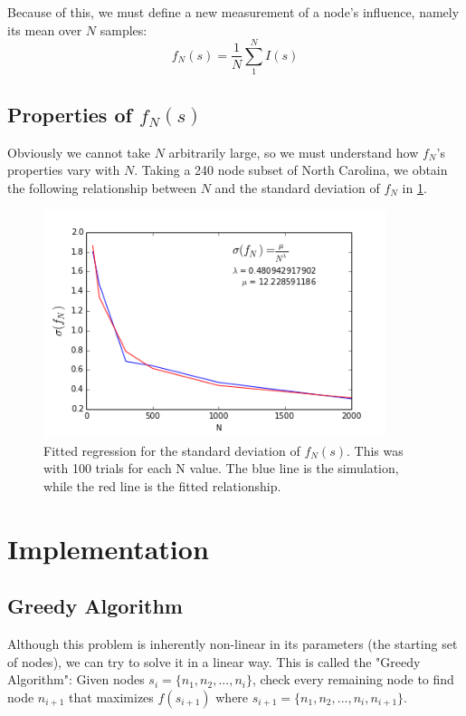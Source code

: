 \documentclass{article}
\begin{document}
	Because of this, we must define a new measurement of a node's influence, namely its mean over $N$ samples:
		\begin{equation}
		\boxed{
			f_N(s) = \frac{1}{N}\sum_1^N I(s)
		}
		\end{equation}
		
		
		
	\subsection{Properties of $f_N(s)$}
	Obviously we cannot take $N$ arbitrarily large, so we must understand how $f_N$'s properties vary with $N$. Taking a 240 node subset of North Carolina, we obtain the following relationship between $N$ and the standard deviation of $f_N$ in \ref{fig:lambda}.
	
		\begin{figure}[h!]
			\centering
			\includegraphics[width=100mm]{lambda_regression.png}
			\caption{Fitted regression for the standard deviation of $f_N(s)$. This was with 100 trials for each N value. The blue line is the simulation, while the red line is the fitted relationship.}
			\label{fig:lambda}
		\end{figure}
			
	
	\section{Implementation}
	
	\subsection{Greedy Algorithm}
	Although this problem is inherently non-linear in its parameters (the starting set of nodes), we can try to solve it in a linear way. This is called the "Greedy Algorithm":
	Given nodes $s_i = \{n_1, n_2,..., n_i\}$, check every remaining node to find node ${n_{i+1}}$ that maximizes $f(s_{i+1})$ where $s_{i+1} =  \{n_1, n_2, ..., n_i, n_{i+1}\}$.
		
\end{document}

